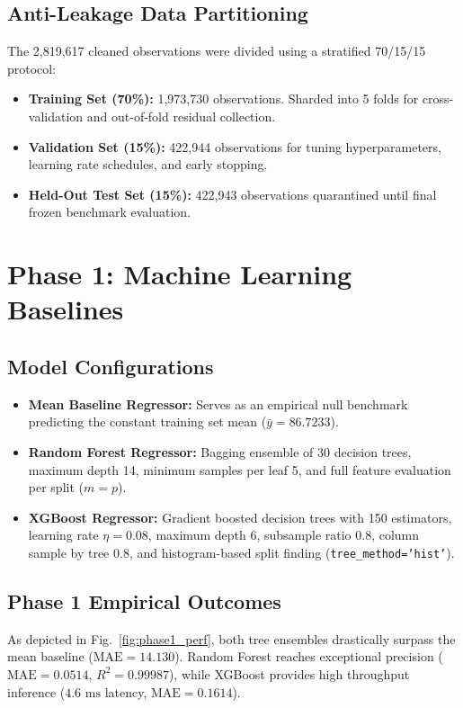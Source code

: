 \documentclass[conference]{IEEEtran}
\begin{document}
\subsection{Anti-Leakage Data Partitioning}
The 2,819,617 cleaned observations were divided using a stratified 70/15/15 protocol:
\begin{itemize}
  \item \textbf{Training Set (70\%):} 1,973,730 observations. Sharded into 5 folds for cross-validation and out-of-fold residual collection.
  \item \textbf{Validation Set (15\%):} 422,944 observations for tuning hyperparameters, learning rate schedules, and early stopping.
  \item \textbf{Held-Out Test Set (15\%):} 422,943 observations quarantined until final frozen benchmark evaluation.
\end{itemize}

\section{Phase 1: Machine Learning Baselines}
\label{sec:ml}

\subsection{Model Configurations}
\begin{itemize}
  \item \textbf{Mean Baseline Regressor:} Serves as an empirical null benchmark predicting the constant training set mean ($\bar{y} = 86.7233$).
  \item \textbf{Random Forest Regressor:} Bagging ensemble of 30 decision trees, maximum depth 14, minimum samples per leaf 5, and full feature evaluation per split ($m = p$).
  \item \textbf{XGBoost Regressor:} Gradient boosted decision trees with 150 estimators, learning rate $\eta = 0.08$, maximum depth 6, subsample ratio 0.8, column sample by tree 0.8, and histogram-based split finding (\texttt{tree\_method='hist'}).
\end{itemize}

\subsection{Phase 1 Empirical Outcomes}
As depicted in Fig.~\ref{fig:phase1_perf}, both tree ensembles drastically surpass the mean baseline ($\text{MAE} = 14.130$). Random Forest reaches exceptional precision ($\text{MAE} = 0.0514$, $R^2 = 0.99987$), while XGBoost provides high throughput inference ($4.6\text{ ms}$ latency, $\text{MAE} = 0.1614$).
\end{document}
